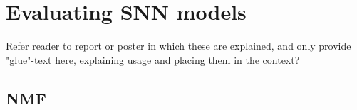 \documentclass[mphil,deptreport,ianc]{infthesis} %
\begin{document}





\section{Evaluating SNN models}

Refer reader to report or poster in which these are explained, and only provide "glue"-text here, explaining usage and placing them in the context?
\cite{Seung1999, Seung2001, Onken2016a}

\subsection{NMF}
\end{document}
